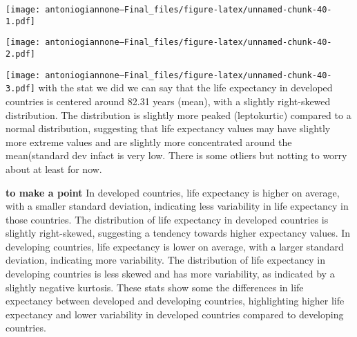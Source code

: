 \documentclass[
]{article}
\newenvironment{Shaded}{\begin{snugshade}}{\end{snugshade}}
\newcommand{\AttributeTok}[1]{\textcolor[rgb]{0.13,0.29,0.53}{#1}}
\newcommand{\CommentTok}[1]{\textcolor[rgb]{0.56,0.35,0.01}{\textit{#1}}}
\newcommand{\FunctionTok}[1]{\textcolor[rgb]{0.13,0.29,0.53}{\textbf{#1}}}
\newcommand{\NormalTok}[1]{#1}
\newcommand{\SpecialCharTok}[1]{\textcolor[rgb]{0.81,0.36,0.00}{\textbf{#1}}}
\newcommand{\StringTok}[1]{\textcolor[rgb]{0.31,0.60,0.02}{#1}}
\begin{document}
\texttt{[image: antoniogiannone---Final\_files/figure-latex/unnamed-chunk-40-1.pdf]}

\begin{Shaded}
\end{Shaded}

\texttt{[image: antoniogiannone---Final\_files/figure-latex/unnamed-chunk-40-2.pdf]}

\begin{Shaded}
\end{Shaded}

\texttt{[image: antoniogiannone---Final\_files/figure-latex/unnamed-chunk-40-3.pdf]}
with the stat we did we can say that the life expectancy in developed
countries is centered around 82.31 years (mean), with a slightly
right-skewed distribution. The distribution is slightly more peaked
(leptokurtic) compared to a normal distribution, suggesting that life
expectancy values may have slightly more extreme values and are slightly
more concentrated around the mean(standard dev infact is very low. There
is some otliers but notting to worry about at least for now.

\textbf{to make a point} In developed countries, life expectancy is
higher on average, with a smaller standard deviation, indicating less
variability in life expectancy in those countries. The distribution of
life expectancy in developed countries is slightly right-skewed,
suggesting a tendency towards higher expectancy values. In developing
countries, life expectancy is lower on average, with a larger standard
deviation, indicating more variability. The distribution of life
expectancy in developing countries is less skewed and has more
variability, as indicated by a slightly negative kurtosis. These stats
show some the differences in life expectancy between developed and
developing countries, highlighting higher life expectancy and lower
variability in developed countries compared to developing countries.
\end{document}
